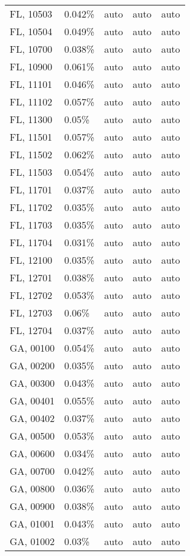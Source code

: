 \begin{longtable}[]{@{}lllll@{}}
FL, 10503 & 0.042\% & auto & auto & auto \\
FL, 10504 & 0.049\% & auto & auto & auto \\
FL, 10700 & 0.038\% & auto & auto & auto \\
FL, 10900 & 0.061\% & auto & auto & auto \\
FL, 11101 & 0.046\% & auto & auto & auto \\
FL, 11102 & 0.057\% & auto & auto & auto \\
FL, 11300 & 0.05\% & auto & auto & auto \\
FL, 11501 & 0.057\% & auto & auto & auto \\
FL, 11502 & 0.062\% & auto & auto & auto \\
FL, 11503 & 0.054\% & auto & auto & auto \\
FL, 11701 & 0.037\% & auto & auto & auto \\
FL, 11702 & 0.035\% & auto & auto & auto \\
FL, 11703 & 0.035\% & auto & auto & auto \\
FL, 11704 & 0.031\% & auto & auto & auto \\
FL, 12100 & 0.035\% & auto & auto & auto \\
FL, 12701 & 0.038\% & auto & auto & auto \\
FL, 12702 & 0.053\% & auto & auto & auto \\
FL, 12703 & 0.06\% & auto & auto & auto \\
FL, 12704 & 0.037\% & auto & auto & auto \\
GA, 00100 & 0.054\% & auto & auto & auto \\
GA, 00200 & 0.035\% & auto & auto & auto \\
GA, 00300 & 0.043\% & auto & auto & auto \\
GA, 00401 & 0.055\% & auto & auto & auto \\
GA, 00402 & 0.037\% & auto & auto & auto \\
GA, 00500 & 0.053\% & auto & auto & auto \\
GA, 00600 & 0.034\% & auto & auto & auto \\
GA, 00700 & 0.042\% & auto & auto & auto \\
GA, 00800 & 0.036\% & auto & auto & auto \\
GA, 00900 & 0.038\% & auto & auto & auto \\
GA, 01001 & 0.043\% & auto & auto & auto \\
GA, 01002 & 0.03\% & auto & auto & auto \\

\end{longtable}
